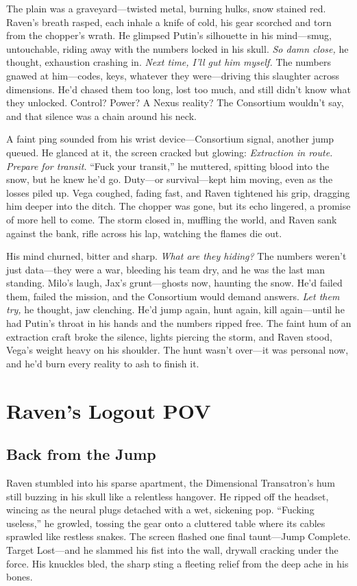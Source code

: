 \documentclass[12pt]{book}
\begin{document}
The plain was a graveyard—twisted metal, burning hulks, snow stained red. Raven’s breath rasped, each inhale a knife of cold, his gear scorched and torn from the chopper’s wrath. He glimpsed Putin’s silhouette in his mind—smug, untouchable, riding away with the numbers locked in his skull. \textit{So damn close,} he thought, exhaustion crashing in. \textit{Next time, I’ll gut him myself.} The numbers gnawed at him—codes, keys, whatever they were—driving this slaughter across dimensions. He’d chased them too long, lost too much, and still didn’t know what they unlocked. Control? Power? A Nexus reality? The Consortium wouldn’t say, and that silence was a chain around his neck.

A faint ping sounded from his wrist device—Consortium signal, another jump queued. He glanced at it, the screen cracked but glowing: \textit{Extraction in route. Prepare for transit.} “Fuck your transit,” he muttered, spitting blood into the snow, but he knew he’d go. Duty—or survival—kept him moving, even as the losses piled up. Vega coughed, fading fast, and Raven tightened his grip, dragging him deeper into the ditch. The chopper was gone, but its echo lingered, a promise of more hell to come. The storm closed in, muffling the world, and Raven sank against the bank, rifle across his lap, watching the flames die out.

His mind churned, bitter and sharp. \textit{What are they hiding?} The numbers weren’t just data—they were a war, bleeding his team dry, and he was the last man standing. Milo’s laugh, Jax’s grunt—ghosts now, haunting the snow. He’d failed them, failed the mission, and the Consortium would demand answers. \textit{Let them try,} he thought, jaw clenching. He’d jump again, hunt again, kill again—until he had Putin’s throat in his hands and the numbers ripped free. The faint hum of an extraction craft broke the silence, lights piercing the storm, and Raven stood, Vega’s weight heavy on his shoulder. The hunt wasn’t over—it was personal now, and he’d burn every reality to ash to finish it.

\chapter{Raven’s Logout POV}
\section{Back from the Jump}

Raven stumbled into his sparse apartment, the Dimensional Transatron’s hum still buzzing in his skull like a relentless hangover. He ripped off the headset, wincing as the neural plugs detached with a wet, sickening pop. ``Fucking useless,'' he growled, tossing the gear onto a cluttered table where its cables sprawled like restless snakes. The screen flashed one final taunt---Jump Complete. Target Lost---and he slammed his fist into the wall, drywall cracking under the force. His knuckles bled, the sharp sting a fleeting relief from the deep ache in his bones.
\end{document}

